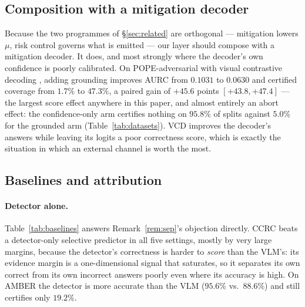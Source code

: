 \documentclass[review,number,doubleblind]{elsarticle}
\theoremstyle{plain}
\theoremstyle{definition}
\theoremstyle{remark}
\begin{document}
\subsection{Composition with a mitigation decoder}
\label{sec:vcd}

Because the two programmes of \S\ref{sec:related} are orthogonal --- mitigation lowers
$\mu$, risk control governs what is emitted --- our layer should compose with a mitigation
decoder. It does, and most strongly where the decoder's own confidence is poorly calibrated. On
POPE-adversarial with visual contrastive decoding \citep{vcd}, adding grounding improves AURC
from $0.1031$ to $0.0630$ and certified coverage from $1.7\%$ to $47.3\%$, a paired gain of
$+45.6$ points $[+43.8,+47.4]$ --- the largest score effect anywhere in this paper, and almost
entirely an abort effect: the confidence-only arm certifies nothing on $95.8\%$ of splits against
$5.0\%$ for the grounded arm (Table~\ref{tab:datasets}). VCD improves the decoder's answers
while leaving its logits a poor correctness score, which is exactly the situation in which an
external channel is worth the most.

\subsection{Baselines and attribution}
\label{sec:attribution}

\paragraph{Detector alone.}
Table~\ref{tab:baselines} answers Remark~\ref{rem:sep}'s objection directly. CCRC beats a
detector-only selective predictor in all five settings, mostly by very large margins, because
the detector's correctness is harder to \emph{score} than the VLM's: its evidence margin is a
one-dimensional signal that saturates, so it separates its own correct from its own incorrect
answers poorly even where its accuracy is high. On AMBER the detector is more accurate than the
VLM ($95.6\%$ vs.\ $88.6\%$) and still certifies only $19.2\%$.
\end{document}
